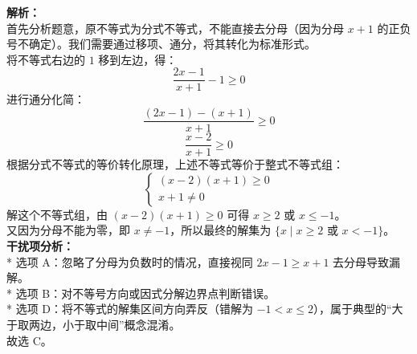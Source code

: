 \documentclass[12pt,a4paper]{exam-zh}
\begin{document}
\begin{solution}
    \textbf{解析：} \\
    首先分析题意，原不等式为分式不等式，不能直接去分母（因为分母 $x+1$ 的正负号不确定）。我们需要通过移项、通分，将其转化为标准形式。 \\
    将不等式右边的 $1$ 移到左边，得：
    \[ \displaystyle\frac{2x-1}{x+1} - 1 \ge 0 \]
    进行通分化简：
    \[ \displaystyle\frac{(2x-1) - (x+1)}{x+1} \ge 0 \]
    \[ \displaystyle\frac{x-2}{x+1} \ge 0 \]
    根据分式不等式的等价转化原理，上述不等式等价于整式不等式组：
    \[ \displaystyle \begin{cases} (x-2)(x+1) \ge 0 \\ x+1 \neq 0 \end{cases} \]
    解这个不等式组，由 $(x-2)(x+1) \ge 0$ 可得 $x \ge 2$ 或 $x \le -1$。 \\
    又因为分母不能为零，即 $x \neq -1$，所以最终的解集为 $\{x \mid x \ge 2 \text{ 或 } x < -1\}$。 \\
    
    \textbf{干扰项分析：} \\
    * 选项 A：忽略了分母为负数时的情况，直接视同 $2x-1 \ge x+1$ 去分母导致漏解。 \\
    * 选项 B：对不等号方向或因式分解边界点判断错误。 \\
    * 选项 D：将不等式的解集区间方向弄反（错解为 $-1 < x \le 2$），属于典型的“大于取两边，小于取中间”概念混淆。 \\
    故选 C。
\end{solution}
\end{document}
